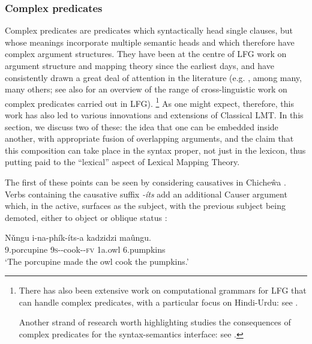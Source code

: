 \documentclass[output=paper]{langscibook}
\begin{document}
\subsubsection{Complex predicates}\label{sec:argstr:complex-preds}

Complex predicates are predicates which syntactically head single clauses, but
whose meanings incorporate multiple semantic heads and which therefore have
complex argument structures. They have been at the centre of LFG work on
argument structure and mapping theory since the earliest days, and have
consistently drawn a great deal of attention in the literature (e.g.
\citealp{Ishikawa1985,Alsina1992,alsina1996the-role,Butt1995,Butt2014,MohananT1994,Matsumoto1992,Matsumoto1996,AndrewsManning1999,Lowe2015,Lovestrand2020},
among many, many others; see also \citealt[351--352]{DLM:LFG} for an overview of
the range of cross-linguistic work on complex predicates carried out in LFG).%
%
\footnote{There has also been extensive work on computational grammars for LFG
  that can handle complex predicates, with a particular focus on Hindi-Urdu: see
  \citet{buttetal03,urdubigram2012,buttking07,
    boegeletal09-urdugram,sulger2012}.

  Another strand of research worth highlighting studies the consequences of
  complex predicates for the syntax-semantics interface: see
  \citet{dal:etal:93,kaplanwedekind93,AndrewsManning1999,
    Andrews2007,HomolaColer2013,Lowe15}.}
%
As one might expect, therefore, this work has also led to various innovations
and extensions of Classical LMT. In this section, we discuss two of these: the
idea that one \astruc{} can be embedded inside another, with appropriate fusion
of overlapping arguments, and the claim that this \astruc{} composition can take
place in the syntax proper, not just in the lexicon, thus putting paid to the
``lexical'' aspect of Lexical Mapping Theory.%

The first of these points can be seen by considering causatives in Chiche\^{w}a
\citep{Alsina1992}. Verbs containing the causative suffix \textit{-\'its} add an
additional Causer argument which, in the active, surfaces as the subject, with
the previous subject being demoted, either to object or oblique status \citep[518]{Alsina1992}:

\ea \label{causeeobject}
\gll N\v{u}ngu i-na-ph\'{i}k-\'{i}ts-a kadzidzi ma\^{u}ngu.\\
 {9.porcupine} {9\textsc{s}-\PST-cook-\CAUS-\textsc{fv}} {1a.owl} {6.pumpkins}\\
\glt `The porcupine made the owl cook the pumpkins.'
\z
\end{document}

